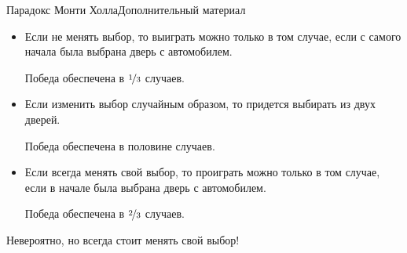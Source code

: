 \begin{frame}{Парадокс Монти Холла}{Дополнительный материал}

\begin{itemize}

\item Если не менять выбор, то выиграть можно только в том случае, если с самого начала была выбрана дверь с автомобилем.

Победа обеспечена в $\nicefrac{1}{3}$ случаев.

\item Если изменить выбор случайным образом, то придется выбирать из двух дверей.

Победа обеспечена в половине случаев.

\item Если всегда менять свой выбор, то проиграть можно только в том случае, если в начале была выбрана дверь с автомобилем.

Победа обеспечена в $\nicefrac{2}{3}$ случаев.

\end{itemize}

Невероятно, но всегда стоит менять свой выбор!


\end{frame}






